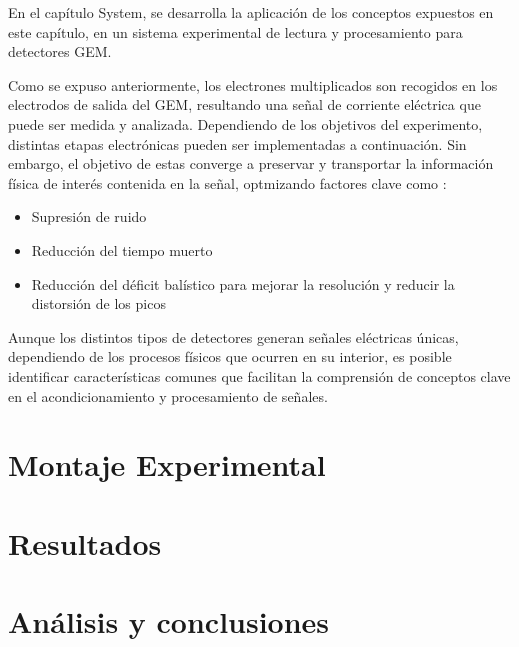 \documentclass[]{book}
\begin{document}
\noindent En el capítulo System, se desarrolla la aplicación de los conceptos expuestos en este capítulo, en un sistema experimental de lectura y procesamiento para detectores GEM.

\noindent Como se expuso anteriormente, los electrones multiplicados son recogidos en los electrodos de salida del GEM, resultando una señal de corriente eléctrica que puede ser medida y analizada. Dependiendo de los objetivos del experimento, distintas etapas electrónicas pueden ser implementadas a continuación. Sin embargo, el objetivo de estas converge a preservar y transportar la información física de interés contenida en la señal, optmizando factores clave como \cite{knoll2010radiation}:

\begin{itemize}
    \item Supresión de ruido 
    \item Reducción del tiempo muerto
    \item Reducción del déficit balístico para mejorar la resolución y reducir la distorsión de los picos
\end{itemize}

\noindent Aunque los distintos tipos de detectores generan señales eléctricas únicas, dependiendo de los procesos físicos que ocurren en su interior, es posible identificar características comunes que facilitan la comprensión de conceptos clave en el acondicionamiento y procesamiento de señales.

\section{Montaje Experimental}
\section{Resultados}
\section{Análisis y conclusiones}



\end{document}
